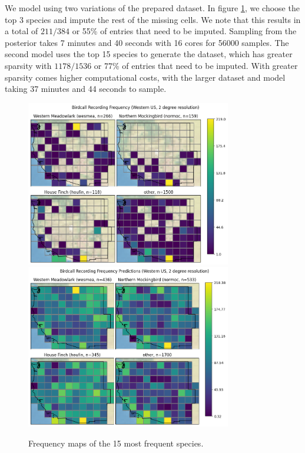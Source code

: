 \documentclass[notitlepage]{article}
\begin{document}
We model using two variations of the prepared dataset.
In figure \ref{fig:map_4}, we choose the top 3 species and impute the rest of the missing cells.
We note that this results in a total of $211/384$ or 55\% of entries that need to be imputed.
Sampling from the posterior takes 7 minutes and 40 seconds with 16 cores for 56000 samples.
The second model uses the top 15 species to generate the dataset, which has greater sparsity with $1178/1536$ or 77\% of entries that need to be imputed.
With greater sparsity comes higher computational costs, with the larger dataset and model taking 37 minutes and 44 seconds to sample.

\begin{figure}[H]
\centering
\includegraphics[width=0.8\textwidth]{report/figures/western_us_raw_4.png}
\includegraphics[width=0.8\textwidth]{report/figures/western_us_predict_4.png}
\caption{Frequency maps of the 15 most frequent species.}
\label{fig:map_4}
\end{figure}
\end{document}
